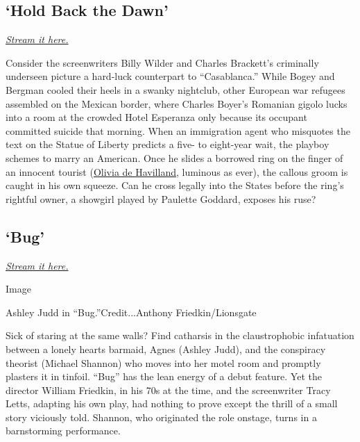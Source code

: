 \hypertarget{hold-back-the-dawn}{%
\subsection{`Hold Back the Dawn'}\label{hold-back-the-dawn}}

\href{https://www.peacocktv.com/watch/asset/movies/drama/hold-back-the-dawn/b990b31a-4ace-302f-ba0c-7d0d57a1e42f}{\emph{Stream
it here.}}

Consider the screenwriters Billy Wilder and Charles Brackett's
criminally underseen picture a hard-luck counterpart to ``Casablanca.''
While Bogey and Bergman cooled their heels in a swanky nightclub, other
European war refugees assembled on the Mexican border, where Charles
Boyer's Romanian gigolo lucks into a room at the crowded Hotel Esperanza
only because its occupant committed suicide that morning. When an
immigration agent who misquotes the text on the Statue of Liberty
predicts a five- to eight-year wait, the playboy schemes to marry an
American. Once he slides a borrowed ring on the finger of an innocent
tourist
(\href{https://www.nytimes.com/2020/07/26/movies/olivia-de-havilland-dead.html}{Olivia
de Havilland}, luminous as ever), the callous groom is caught in his own
squeeze. Can he cross legally into the States before the ring's rightful
owner, a showgirl played by Paulette Goddard, exposes his ruse?

\hypertarget{bug}{%
\subsection{`Bug'}\label{bug}}

\href{https://www.peacocktv.com/watch/asset/movies/thriller/bug/638239f5-0e3e-338f-8448-a3e55aeb9a24}{\emph{Stream
it here.}}

Image

Ashley Judd in ``Bug.''Credit...Anthony Friedkin/Lionsgate

Sick of staring at the same walls? Find catharsis in the claustrophobic
infatuation between a lonely hearts barmaid, Agnes (Ashley Judd), and
the conspiracy theorist (Michael Shannon) who moves into her motel room
and promptly plasters it in tinfoil. ``Bug'' has the lean energy of a
debut feature. Yet the director William Friedkin, in his 70s at the
time, and the screenwriter Tracy Letts, adapting his own play, had
nothing to prove except the thrill of a small story viciously told.
Shannon, who originated the role onstage, turns in a barnstorming
performance.

